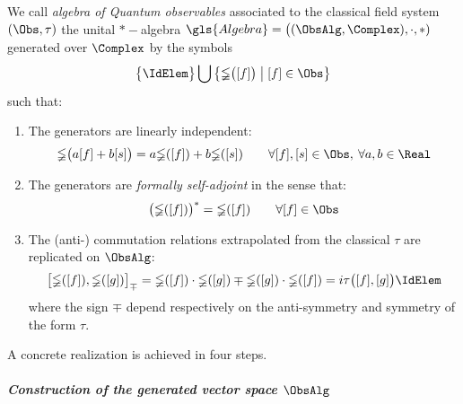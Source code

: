 \documentclass[Main]{subfiles}
\begin{document}
		\begin{definition}\label{Def:QuantumObsAlgebra}
			We call \emph{algebra of Quantum observables} associated to the classical field system $(\Obs, \tau)$ the unital $\ast-$algebra $\gls{Algebra}= \big( (\ObsAlg, \Complex),\cdot,*)$ generated over $\Complex$ by the symbols 
			\begin{displaymath}
				\big\{\IdElem\big\}\bigcup \big\{\mathbb{\Phi}\big( [f]\big) \; \big\vert \;  [f] \in \Obs \big\}
			\end{displaymath}
			such that:
			\begin{enumerate}
				\item The generators are linearly independent:
					\begin{equation}\label{Ip:GenIndip}
						\mathbb{\Phi} \big(a [f] + b [s] \big) = 
						a \mathbb{\Phi} ([f]) + b \mathbb{\Phi} ([s]) \qquad \forall [f],[s] \in \Obs,\: \forall a,b \in \Real
					\end{equation}
				\item The generators are \emph{formally self-adjoint} in the sense that:
					\begin{equation}\label{Ip:GenSelfAd}
						\big( \mathbb{\Phi}([f]) \big)^* = \mathbb{\Phi}([f]) \qquad \forall [f] \in \Obs
					\end{equation}
				\item The (anti-) commutation relations extrapolated from %
					the classical $\tau$ are replicated on $\ObsAlg$:
					\begin{equation}\label{Ip:ImplementCCR}
						\big[ \mathbb{\Phi}([f]), \mathbb{\Phi}([g]) \big]_\mp = \mathbb{\Phi}([f]) \cdot \mathbb{\Phi}([g]) \mp \mathbb{\Phi}([g]) \cdot \mathbb{\Phi}([f]) = i \tau\big( [f], [g] \big) \IdElem
					\end{equation}
					where the sign $\mp$ depend respectively on the anti-symmetry and symmetry of the form $\tau$.
			\end{enumerate}

		\end{definition}
		\vspace{3mm}
		
		A concrete realization is achieved in four steps.
			\subparagraph{Construction of the generated vector space $\ObsAlg$}
			
\end{document}
